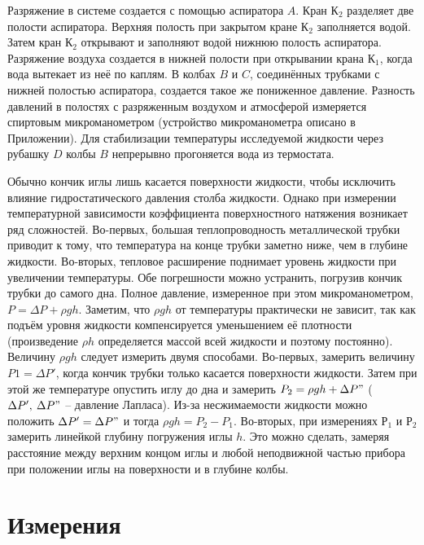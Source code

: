 \documentclass[a4paper,11.5pt]{article} %
\begin{document}
\bigskip

Разряжение в системе создается с помощью аспиратора $A$. Кран К$_2$ разделяет две полости аспиратора. Верхняя полость при закрытом кране К$_2$ заполняется водой. Затем кран К$_2$ открывают и заполняют водой нижнюю полость аспиратора. Разряжение воздуха создается в нижней полости при открывании крана К$_1$, когда вода вытекает из неё по каплям. В колбах $B$ и $C$, соединённых трубками с нижней полостью аспиратора, создается такое же пониженное давление. Разность давлений в полостях с разряженным воздухом и атмосферой измеряется спиртовым микроманометром (устройство микроманометра описано в Приложении).
Для стабилизации температуры исследуемой жидкости через рубашку $D$ колбы $B$ непрерывно прогоняется вода из термостата.


Обычно кончик иглы лишь касается поверхности жидкости, чтобы исключить влияние гидростатического давления столба жидкости. Однако при измерении температурной зависимости коэффициента поверхностного натяжения возникает ряд сложностей. Во-первых, большая теплопроводность металлической трубки приводит к тому, что температура на конце трубки заметно ниже, чем в глубине жидкости. Во-вторых, тепловое расширение поднимает уровень жидкости при увеличении температуры.
Обе погрешности можно устранить, погрузив кончик трубки до самого дна. Полное давление, измеренное при этом микроманометром, $P = \Delta P + \rho gh$. Заметим, что $\rho gh$ от температуры практически не зависит, так как подъём уровня жидкости компенсируется уменьшением её плотности (произведение $\rho h$ определяется массой всей жидкости и поэтому постоянно). Величину $\rho gh$ следует измерить двумя способами. Во-первых, замерить величину $P1 = \Delta P'$, когда кончик трубки только касается поверхности жидкости. Затем при этой же температуре опустить иглу до дна и замерить $P_2 = \rho gh + \Delta P"$ ($\Delta P' ,\: \Delta P"$ – давление Лапласа). Из-за несжимаемости жидкости можно положить $\Delta P' = \Delta P"$ и тогда $\rho gh = P_2 -P_1$. Во-вторых, при измерениях $Р_1$ и $Р_2$ замерить линейкой глубину погружения иглы $h$. Это можно сделать, замеряя расстояние между верхним концом иглы и любой неподвижной частью прибора при положении иглы на поверхности и в глубине колбы.

\section{Измерения}
\end{document}
